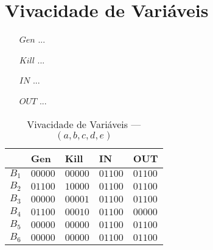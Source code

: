 \section{Vivacidade de Vari\'aveis}

\begin{itemize}
  \item[$Gen$] ...
  \item[$Kill$] ...
  \item[$IN$] ...
  \item[$OUT$] ...
\end{itemize}



\begin{table}[ht]
\centering
\begin{tabular}{l|l|l|l|l}
	& Gen & Kill & IN & OUT\\
\hline
$B_{1}$ &  $00000$ & $00000$ & $01100$ & $01100$\\
$B_{2}$ &  $01100$ & $10000$ & $01100$ & $01100$\\
$B_{3}$ &  $00000$ & $00001$ & $01100$ & $01100$\\
$B_{4}$ &  $01100$ & $00010$ & $01100$ & $00000$\\
$B_{5}$ &  $00000$ & $00000$ & $01100$ & $01100$\\
$B_{6}$ &  $00000$ & $00000$ & $01100$ & $01100$\\
\end{tabular}
\caption{Vivacidade de Vari\'aveis --- $(a, b, c, d, e)$}
\end{table}

